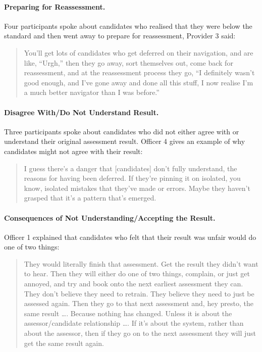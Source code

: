 \documentclass[
  12pt,
  a4paper,
]{book}
\begin{document}
\hypertarget{preparing-for-reassessment.}{%
\paragraph{Preparing for Reassessment.}\label{preparing-for-reassessment.}}

Four participants spoke about candidates who realised that they were below the standard and then went away to prepare for reassessment, Provider 3 said:

\begin{quote}
You'll get lots of candidates who get deferred on their navigation, and are like, ``Urgh,'' then they go away, sort themselves out, come back for reassessment, and at the reassessment process they go, ``I definitely wasn't good enough, and I've gone away and done all this stuff, I now realise I'm a much better navigator than I was before.''
\end{quote}

\hypertarget{disagree-withdo-not-understand-result.}{%
\paragraph{Disagree With/Do Not Understand Result.}\label{disagree-withdo-not-understand-result.}}

Three participants spoke about candidates who did not either agree with or understand their original assessment result. Officer 4 gives an example of why candidates might not agree with their result:

\begin{quote}
I guess there's a danger that {[}candidates{]} don't fully understand, the reasons for having been deferred. If they're pinning it on isolated, you know, isolated mistakes that they've made or errors. Maybe they haven't grasped that it's a pattern that's emerged.
\end{quote}

\hypertarget{consequences-of-not-understandingaccepting-the-result.}{%
\paragraph{Consequences of Not Understanding/Accepting the Result.}\label{consequences-of-not-understandingaccepting-the-result.}}

Officer 1 explained that candidates who felt that their result was unfair would do one of two things:

\begin{quote}
They would literally finish that assessment. Get the result they didn't want to hear. Then they will either do one of two things, complain, or just get annoyed, and try and book onto the next earliest assessment they can. They don't believe they need to retrain. They believe they need to just be assessed again. Then they go to that next assessment and, hey presto, the same result \ldots. Because nothing has changed. Unless it is about the assessor/candidate relationship \ldots. If it's about the system, rather than about the assessor, then if they go on to the next assessment they will just get the same result again.
\end{quote}
\end{document}
